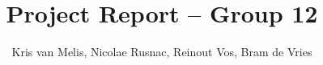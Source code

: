 \documentclass[sigconf,nonacm]{acmart}
\title{Project Report -- Group 12}
\author{Kris van Melis, Nicolae Rusnac, Reinout Vos, Bram de Vries}
\begin{document}
\begin{abstract}

\end{abstract}

\maketitle













\end{document}
